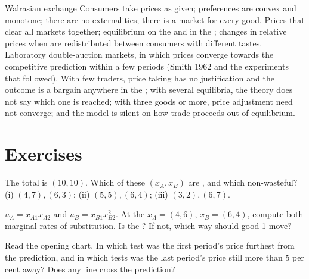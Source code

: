 \begin{model}{Walrasian exchange}
\assumes Consumers take prices as given; preferences are convex and monotone; there are no externalities;
there is a market for every good.
\predicts Prices that clear all markets together; equilibrium  on the  and in
the ; changes in relative prices when  are redistributed between consumers with different
tastes.
\tested Laboratory double-auction markets, in which prices converge towards the competitive prediction
within a few periods (Smith 1962 and the experiments that followed).
\breaks With few traders, price taking has no justification and the outcome is a bargain anywhere in the
; with several equilibria, the theory does not say which one is reached; with three goods or more,
price adjustment need not converge; and the model is silent on how trade proceeds out of equilibrium.
\end{model}

\section{Exercises}\label{sec:b2:exchange-economies:exercises}

\begin{exercise}[$\star$]\label{exo:b2:exchange-economies:1}
The total  is $(10, 10)$. Which of these  $(x_A, x_B)$ are , and which
non-wasteful? (i) $(4, 7), (6, 3)$; (ii) $(5, 5), (6, 4)$; (iii) $(3, 2), (6, 7)$.
\end{exercise}

\begin{exercise}[$\star$]\label{exo:b2:exchange-economies:2}
$u_A = x_{A1}x_{A2}$ and $u_B = x_{B1}x_{B2}^2$. At the  $x_A = (4, 6)$, $x_B = (6, 4)$, compute
both marginal rates of substitution. Is the  ? If not, which way should good 1
move?
\end{exercise}

\begin{exercise}[$\star$]\label{exo:b2:exchange-economies:3}
Read the opening chart. In which test was the first period's price furthest from the prediction, and
in which tests was the last period's price still more than 5 per cent away? Does any line cross the
prediction?
\end{exercise}


